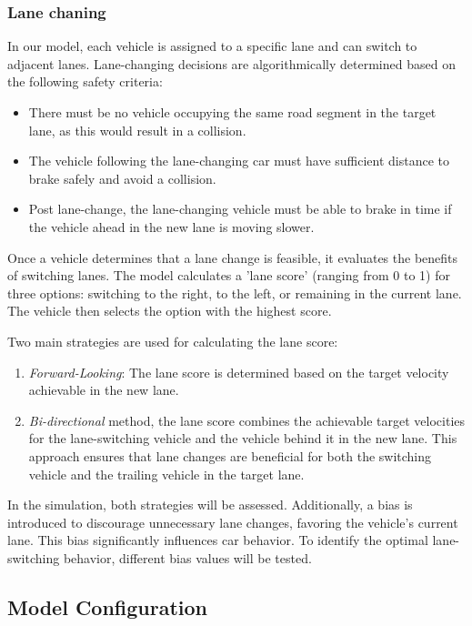 \documentclass{article}
\begin{document}
\subsubsection{Lane chaning}
In our model, each vehicle is assigned to a specific lane and can switch to adjacent lanes. Lane-changing decisions are algorithmically determined based on the following safety criteria:
\begin{itemize}
\item There must be no vehicle occupying the same road segment in the target lane, as this would result in a collision.
\item The vehicle following the lane-changing car must have sufficient distance to brake safely and avoid a collision.
\item Post lane-change, the lane-changing vehicle must be able to brake in time if the vehicle ahead in the new lane is moving slower.
\end{itemize}

Once a vehicle determines that a lane change is feasible, it evaluates the benefits of switching lanes. The model calculates a 'lane score' (ranging from 0 to 1) for three options: switching to the right, to the left, or remaining in the current lane. The vehicle then selects the option with the highest score.

Two main strategies are used for calculating the lane score:
\begin{enumerate}
\item \textit{Forward-Looking}: The lane score is determined based on the target velocity achievable in the new lane.
\item \textit{Bi-directional} method, the lane score combines the achievable target velocities for the lane-switching vehicle and the vehicle behind it in the new lane. This approach ensures that lane changes are beneficial for both the switching vehicle and the trailing vehicle in the target lane.
\end{enumerate}

In the simulation, both strategies will be assessed. Additionally, a bias is introduced to discourage unnecessary lane changes, favoring the vehicle's current lane. This bias significantly influences car behavior. To identify the optimal lane-switching behavior, different bias values will be tested. 

\subsection{Model Configuration}
\end{document}
